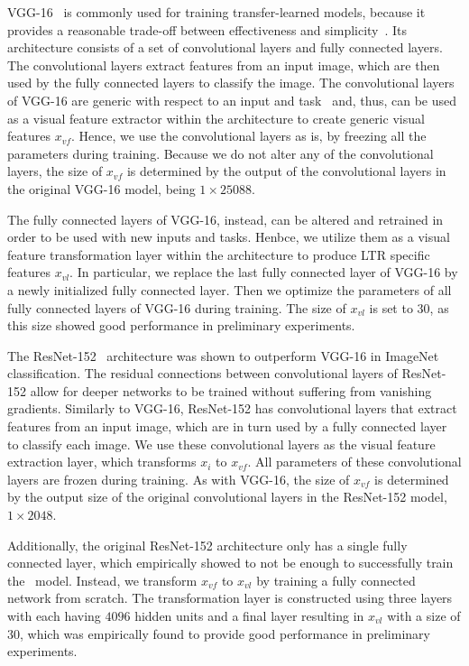 VGG-16~\cite{simonyan2014very} is commonly used for training transfer-learned models,
because it provides a reasonable trade-off between effectiveness and simplicity~\cite{shan2017two}.
Its architecture consists of a set of convolutional layers and fully connected layers. 
The convolutional layers extract features from an input image, which are then used by the fully connected layers to classify the image. 
The convolutional layers of VGG-16 are generic with respect to an input and task~\citep{donahue2014decaf}
and, thus, can be used as a visual feature extractor within the \modelname{} architecture to create generic visual features $x_{vf}$.
Hence, we use the convolutional layers as is, by freezing all the parameters during training.
Because we do not alter any of the convolutional layers, the size of $x_{vf}$ is determined by the output of the convolutional layers in the original VGG-16 model, being $1\times25088$.

The fully connected layers of VGG-16, instead, can be altered and retrained in order to be used with new inputs and tasks.
Henbce, we utilize them as a visual feature transformation layer within the \modelname{} architecture to produce \ac{LTR} specific features $x_{vl}$.
In particular, we replace the last fully connected layer of VGG-16 by a newly initialized fully connected layer.
Then we optimize the parameters of all fully connected layers of VGG-16 during training.
The size of $x_{vl}$ is set to $30$, as this size showed good performance in preliminary experiments.

The ResNet-152~\cite{he2016deep} architecture was shown to outperform VGG-16 in ImageNet classification.
The residual connections between convolutional layers of ResNet-152 allow for deeper networks to be trained without suffering from vanishing gradients.
Similarly to VGG-16, ResNet-152 has convolutional layers that extract features from an input image, which are in turn used by a fully connected layer to classify each image.
We use these convolutional layers as the visual feature extraction layer, which transforms $x_{i}$ to $x_{vf}$. All parameters of these convolutional layers are frozen during training. As with VGG-16, the size of $x_{vf}$ is determined by the output size of the original convolutional layers in the ResNet-152 model, $1\times2048$.


Additionally, the original ResNet-152 architecture only has a single fully connected layer, which empirically showed to not be enough to successfully train the \modelname~model.
Instead, we transform $x_{vf}$ to $x_{vl}$ by training a fully connected network from scratch.
The transformation layer is constructed using three layers with each having $4096$ hidden units and a final layer resulting in $x_{vl}$ with a size of $30$, which was empirically found to provide good performance in preliminary experiments.


